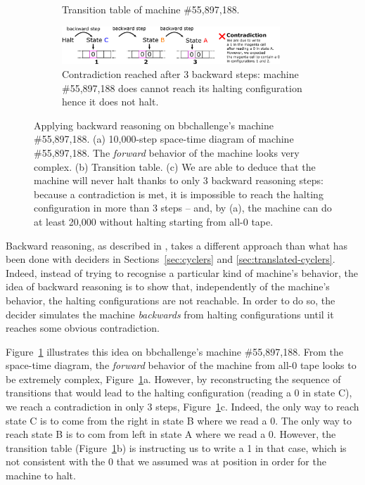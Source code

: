 \begin{figure}
\begin{subfigure}[m]{0.45\textwidth}
    \caption{Transition table of machine \#55,897,188.}

  \end{subfigure}

  \begin{subfigure}[m]{1\textwidth}
    \vspace{5ex}
    \centering
    \includegraphics[width=0.9\textwidth]{backward-reasoning.pdf}

    \caption{Contradiction reached after 3 backward steps: machine \#55,897,188 does cannot reach its halting configuration hence it does not halt.}

  \end{subfigure}

  \caption{Applying backward reasoning on bbchallenge's machine \#55,897,188. (a) 10,000-step space-time diagram of machine \#55,897,188. The \textit{forward} behavior of the machine looks very complex. (b) Transition table. (c) We are able to deduce that the machine will never halt thanks to only 3 backward reasoning steps: because a contradiction is met, it is impossible to reach the halting configuration in more than 3 steps -- and, by (a), the machine can do at least 20,000 without halting starting from all-0 tape.}
  \label{fig:backward-reasoning}
\end{figure}


Backward reasoning, as described in \cite{Marxen_1998}, takes a different approach than what has been done with deciders in Sections~\ref{sec:cyclers} and \ref{sec:translated-cyclers}. Indeed, instead of trying to recognise a particular kind of machine's behavior, the idea of backward reasoning is to show that, independently of the machine's behavior, the halting configurations are not reachable. In order to do so, the decider simulates the machine \textit{backwards} from halting configurations until it reaches some obvious contradiction.

Figure~\ref{fig:backward-reasoning} illustrates this idea on bbchallenge's machine \#55,897,188. From the space-time diagram, the \textit{forward} behavior of the machine from all-0 tape looks to be extremely complex, Figure~\ref{fig:backward-reasoning}a. However, by reconstructing the sequence of transitions that would lead to the halting configuration (reading a 0 in state \textcolor{colorC}{C}), we reach a contradiction in only 3 steps, Figure~\ref{fig:backward-reasoning}c. Indeed, the only way to reach state  \textcolor{colorC}{C} is to come from the right in state \textcolor{colorB}{B} where we read a 0. The only way to reach state \textcolor{colorB}{B} is to com from left in state  \textcolor{colorA}{A} where we read a 0. However, the transition table (Figure~\ref{fig:backward-reasoning}b) is instructing us to write a 1 in that case, which is not consistent with the 0 that we assumed was at position in order for the machine to halt.

